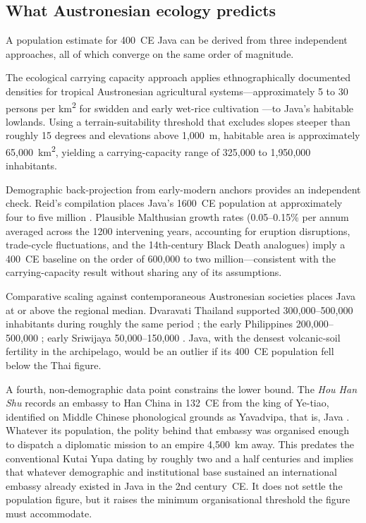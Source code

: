 \documentclass[12pt,a4paper]{article}
\begin{document}
\subsection{What Austronesian ecology predicts}

A population estimate for 400~CE Java can be derived from three independent approaches, all of which converge on the same order of magnitude.

The ecological carrying capacity approach applies ethnographically documented densities for tropical Austronesian agricultural systems---approximately 5 to 30 persons per km\textsuperscript{2} for swidden and early wet-rice cultivation \citep{bellwood2017,kirch2000,baylisssmith1980}---to Java's habitable lowlands. Using a terrain-suitability threshold that excludes slopes steeper than roughly 15 degrees and elevations above 1{,}000~m, habitable area is approximately 65{,}000~km\textsuperscript{2}, yielding a carrying-capacity range of 325{,}000 to 1{,}950{,}000 inhabitants.

Demographic back-projection from early-modern anchors provides an independent check. Reid's compilation places Java's 1600~CE population at approximately four to five million \citep{reid1988}. Plausible Malthusian growth rates (0.05--0.15\% per annum averaged across the 1200 intervening years, accounting for eruption disruptions, trade-cycle fluctuations, and the 14th-century Black Death analogues) imply a 400~CE baseline on the order of 600{,}000 to two million---consistent with the carrying-capacity result without sharing any of its assumptions.

Comparative scaling against contemporaneous Austronesian societies places Java at or above the regional median. Dvaravati Thailand supported 300{,}000--500{,}000 inhabitants during roughly the same period \citep{higham2014}; the early Philippines 200{,}000--500{,}000 \citep{junker1999}; early Sriwijaya 50{,}000--150{,}000 \citep{manguin2004}. Java, with the densest volcanic-soil fertility in the archipelago, would be an outlier if its 400~CE population fell below the Thai figure.

A fourth, non-demographic data point constrains the lower bound. The \textit{Hou Han Shu} records an embassy to Han China in 132~CE from the king of Ye-tiao, identified on Middle Chinese phonological grounds as Yavadvipa, that is, Java \citep{pelliot1916,wolters1967}. Whatever its population, the polity behind that embassy was organised enough to dispatch a diplomatic mission to an empire 4{,}500~km away. This predates the conventional Kutai Yupa dating by roughly two and a half centuries and implies that whatever demographic and institutional base sustained an international embassy already existed in Java in the 2nd century~CE. It does not settle the population figure, but it raises the minimum organisational threshold the figure must accommodate.
\end{document}
